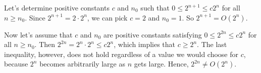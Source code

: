Let's determine positive constants $c$ and $n_0$ such that $0\le2^{n+1}\le c2^n$ for all $n\ge n_0$.
Since $2^{n+1}=2\cdot2^n$, we can pick $c=2$ and $n_0=1$.
So $2^{n+1}=O(2^n)$.

Now let's assume that $c$ and $n_0$ are positive constants satisfying $0\le2^{2n}\le c2^n$ for all $n\ge n_0$.
Then $2^{2n}=2^n\cdot2^n\le c2^n$, which implies that $c\ge2^n$.
The last inequality, however, does not hold regardless of a value we would choose for $c$, because $2^n$ becomes arbitrarily large as $n$ gets large.
Hence, $2^{2n}\ne O(2^n)$.
